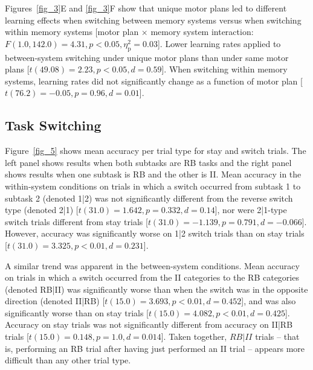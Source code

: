 \documentclass[doc, floatsintext]{apa7}
\begin{document}

Figures~\ref{fig_3}E and \ref{fig_3}F show that unique motor
plans led to different learning effects when switching
between memory systems versus when switching within memory
systems [motor plan $\times$ memory system interaction:
$F(1.0, 142.0) = 4.31, p < 0.05, \eta_{\text{p}}^{2} =
0.03$]. Lower learning rates applied to between-system
switching under unique motor plans than under same motor
plans [$t(49.08) = 2.23, p < 0.05, d = 0.59$]. When
switching within memory systems, learning rates did not
significantly change as a function of motor plan [$t(76.2) =
-0.05, p = 0.96, d = 0.01$].

\subsection{Task Switching}
Figure~\ref{fig_5} shows mean accuracy per trial type for
stay and switch trials. The left panel shows results when
both subtasks are RB tasks and the right panel shows results
when one subtask is RB and the other is II. Mean accuracy in
the within-system conditions on trials in which a switch
occurred from subtask 1 to subtask 2 (denoted 1|2) was not
significantly different from the reverse switch type
(denoted 2|1) [$t(31.0) = 1.642, p = 0.332, d = 0.14$], nor
were 2|1-type switch trials different from stay trials
[$t(31.0) = -1.139, p = 0.791, d = -0.066$]. However,
accuracy was significantly worse on 1|2 switch trials than
on stay trials [$t(31.0) = 3.325, p < 0.01, d = 0.231$].

A similar trend was apparent in the between-system
conditions. Mean accuracy on trials in which a switch
occurred from the II categories to the RB categories
(denoted RB|II) was significantly worse than when the switch
was in the opposite direction (denoted II|RB) [$t(15.0) =
3.693, p < 0.01, d = 0.452$], and was also significantly
worse than on stay trials [$t(15.0) = 4.082, p < 0.01, d =
0.425$]. Accuracy on stay trials was not significantly
different from accuracy on II|RB trials [$t(15.0) = 0.148, p
= 1.0, d = 0.014$]. Taken together, $RB|II$ trials -- that
is, performing an RB trial after having just performed an II
trial -- appears more difficult than any other trial type.
\end{document}

